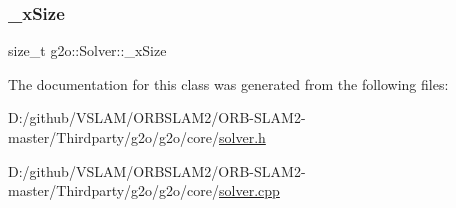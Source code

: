 \mbox{\label{classg2o_1_1_solver_abcf7731347f14915bd9ba963021ea830}} 
\subsubsection{\texorpdfstring{\+\_\+x\+Size}{\_xSize}}
{\footnotesize\ttfamily size\+\_\+t g2o\+::\+Solver\+::\+\_\+x\+Size\hspace{0.3cm}{\ttfamily [protected]}}



The documentation for this class was generated from the following files\+:\begin{DoxyCompactItemize}
\item 
D\+:/github/\+V\+S\+L\+A\+M/\+O\+R\+B\+S\+L\+A\+M2/\+O\+R\+B-\/\+S\+L\+A\+M2-\/master/\+Thirdparty/g2o/g2o/core/\mbox{\hyperlink{solver_8h}{solver.\+h}}\item 
D\+:/github/\+V\+S\+L\+A\+M/\+O\+R\+B\+S\+L\+A\+M2/\+O\+R\+B-\/\+S\+L\+A\+M2-\/master/\+Thirdparty/g2o/g2o/core/\mbox{\hyperlink{solver_8cpp}{solver.\+cpp}}\end{DoxyCompactItemize}
